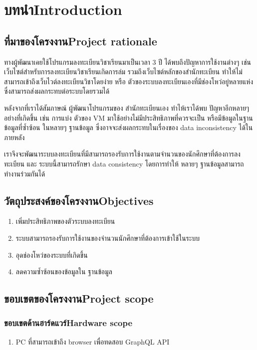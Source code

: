 \chapter{\ifcpe บทนำ\else Introduction\fi}

\section{\ifcpe ที่มาของโครงงาน\else Project rationale\fi}

\enskip ทางผู้พัฒนาเคยใช้โปรแกรมลงทะเบียนวิชาเรียนมาเป็นเวลา 3 ปี ได้พบถึงปัญหาการใช้งานต่างๆ เช่น เว็บไซต์สำหรับการลงทะเบียนวิชาเรียนเกิดการล่ม รวมถึงเว็บไซต์หลักของสำนักทะเบียน ทำให้ไม่สามารถเข้าถึงเว็บไวต์ลงทะเบียนวิชาโดยง่าย หรือ ตัวของระบบลงทะเบียนเองที่มีช่องโหว่อยู่หลายแห่ง ซึ่งสามารถส่งผลกระทบต่อระบบโดยรวมได้

หลังจากที่เราได้สัมภาษณ์ ผู้พัฒนาโปรแกรมของ สำนักทะเบียนเอง ทำไห้เราได้พบ ปัญหาอีกหลายๆ อย่างที่เกิดขึ้น เช่น การแบ่ง ตัวของ VM \cite{vm} มาใช้อย่างไม่มีประสิทธิภาพที่ควรจะเป็น หรือมีข้อมูลในฐานข้อมูลที่ซ้ำซ้อน ในหลายๆ ฐานข้อมูล ซึ่งอาจจะส่งผลกระทบในเรื่องของ data inconsistency ได้ในภายหลัง

เราจึงจะพัฒนาระบบลงทะเบียนที่มีสามารถรองรับการใช้งานตามจำนวนของนักศึกษาที่ต้องการลงทะเบียน และ ระบบนี้สามารถรักษา data consistency โดยการทำให้ หลายๆ ฐานข้อมูลสามารถทำงานร่วมกันได้

\section{\ifcpe วัตถุประสงค์ของโครงงาน\else Objectives\fi}
\begin{enumerate}
    \item เพิ่มประสิทธิภาพของตัวระบบลงทะเบียน
    \item ระบบสามารถรองรับการใช้งานของจำนวนนักศึกษาที่ต้องการเข้าใช้ในระบบ
    \item อุดช่องโหว่ของระบบที่เกิดขึ้น
    \item ลดความซ้ำซ้อนของข้อมูลใน ฐานข้อมูล
\end{enumerate}

\section{\ifcpe ขอบเขตของโครงงาน\else Project scope\fi}

\subsection{\ifcpe ขอบเขตด้านฮาร์ดแวร์\else Hardware scope\fi}
\begin{enumerate}
    \item PC ที่สามารถเข้าถึง browser เพื่อทดสอบ GraphQL API
\end{enumerate}
